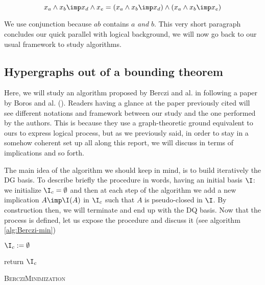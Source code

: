 	\[ x_a \land x_b \imp x_d \land x_e = (x_a \land x_b \imp x_d)
	\land (x_a \land x_b \imp x_e) \]

\noindent We use conjunction because $ab$ contains $a$ \textit{and} $b$. This
very short paragraph concludes our quick parallel with logical background, we will now go back to our usual framework to study algorithms.

\subsection{Hypergraphs out of a bounding theorem}

Here, we will study an algorithm proposed by Berczi and al. in 
\cite{berczi_directed_2017} following a paper by Boros and al. 
(\cite{boros_strong_2017}). Readers having a glance at the paper previously 
cited will see different notations and framework between our study and the one 
performed by the authors. This is because they use a graph-theoretic ground 
equivalent to ours to express logical process, but as we previously said, in order to stay in a somehow coherent set up all along this report, we will discuss in terms of implications and so forth.

\vspace{1.2em}

The main idea of the algorithm we should keep in mind, is to build iteratively
the DG basis. To describe briefly the procedure in words, having an initial 
basis $\I$: we initialize $\I_c = \emptyset$ and then at each step of the 
algorithm we add a new implication $A \imp \I(A)$ in $\I_c$ such that $A$ is 
pseudo-closed in $\I$. By construction then, we will terminate and end up with 
the DQ basis. Now that the process is defined, let us expose the procedure
and discuss it (see algorithm \ref{alg:Berczi-min})

\begin{algorithm}
	
	\BlankLine
	\BlankLine
	
	$\I_c := \emptyset$ \;
	
	
	return $\I_c$ \;
	
	\caption{\textsc{BercziMinimization}}
	\label{alg:Berczi-min}
\end{algorithm}

